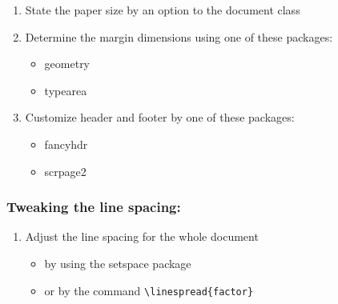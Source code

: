 \documentclass{article}
\begin{document}
\begin{enumerate}
	\item State the paper size by an option to the document class
	\item Determine the margin dimensions using one of these packages:
	\begin{itemize}
	\item geometry
	\item typearea
	\end{itemize}
\item Customize header and footer by one of these packages:
	\begin{itemize}
	\item fancyhdr
	\item scrpage2
	\end{itemize}
\end{enumerate}
\subsubsection*{Tweaking the line spacing:}
\begin{enumerate}[resume*]
\item Adjust the line spacing for the whole document
	\begin{itemize}
	\item by using the setspace package
	\item or by the command \verb|\linespread{factor}|
	\end{itemize}
\end{enumerate}
\end{document}
